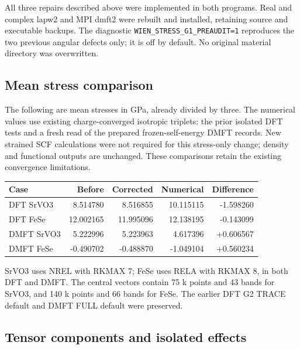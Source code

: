 \documentclass[11pt]{article}
\begin{document}
All three repairs described above were implemented in both programs. Real and complex lapw2 and MPI dmft2 were rebuilt and installed, retaining source and executable backups. The diagnostic \texttt{WIEN\_STRESS\_G1\_PREAUDIT=1} reproduces the two previous angular defects only; it is off by default. No original material directory was overwritten.

\subsection{Mean stress comparison}

The following are mean stresses in GPa, already divided by three. The numerical values use existing charge-converged isotropic triplets: the prior isolated DFT tests and a fresh read of the prepared frozen-self-energy DMFT records. New strained SCF calculations were not required for this stress-only change; density and functional outputs are unchanged. These comparisons retain the existing convergence limitations.

\begin{center}\small\begin{tabular}{lrrrr}\toprule

Case & Before & Corrected & Numerical & Difference\\\midrule

DFT SrVO3 & 8.514780 & 8.516855 & 10.115115 & -1.598260\\

DFT FeSe & 12.002165 & 11.995096 & 12.138195 & -0.143099\\

DMFT SrVO3 & 5.222996 & 5.223963 & 4.617396 & +0.606567\\

DMFT FeSe & -0.490702 & -0.488870 & -1.049104 & +0.560234\\

\bottomrule\end{tabular}\end{center}

SrVO3 uses NREL with RKMAX 7; FeSe uses RELA with RKMAX 8, in both DFT and DMFT. The central vectors contain 75 k points and 43 bands for SrVO3, and 140 k points and 66 bands for FeSe. The earlier DFT G2 TRACE default and DMFT FULL default were preserved.

\subsection{Tensor components and isolated effects}
\end{document}
